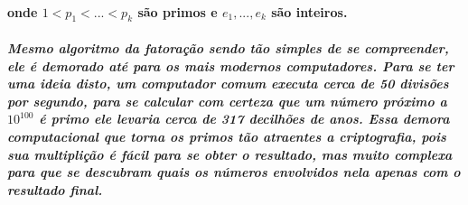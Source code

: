 \paragraph{
onde $1 < p_1 < ... < p_k $ s\~ao primos e $e_1, ..., e_k$ s\~ao inteiros.
}
\subparagraph{
Mesmo algoritmo da fatora\c{c}\~ao sendo t\~ao simples de se compreender, ele \'e demorado at\'e para os mais modernos computadores. Para se ter uma ideia disto, um computador comum executa cerca de {50} divis\~oes por segundo, para se calcular com certeza que um n\'umero pr\'oximo a $10^{100}$ \'e primo ele levaria cerca de {317} decilh\~oes de anos. Essa demora computacional que torna os primos t\~ao atraentes a criptografia, pois sua multipli\c{c}\~ao \'e f\'acil para se obter o resultado, mas muito complexa para que se descubram quais os n\'umeros envolvidos nela apenas com o resultado final.
}


